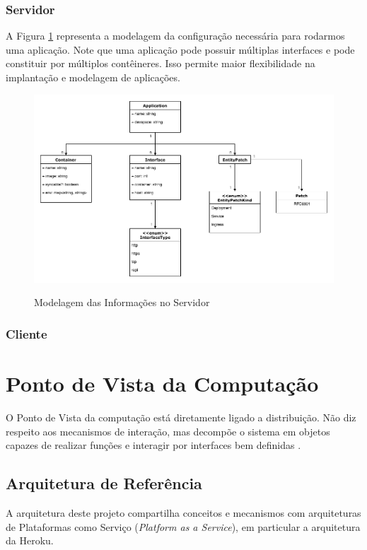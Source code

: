 	        \subsubsection{Servidor}
	        A Figura \ref{fig:info-server} representa a modelagem da configuração necessária para rodarmos uma aplicação. Note que uma aplicação pode possuir múltiplas interfaces e pode constituir por múltiplos contêineres. Isso permite maior flexibilidade na implantação e modelagem de aplicações.
	        \begin{figure}[htb]
        	    \centering
        	    \caption{Modelagem das Informações no Servidor}
        	    \includegraphics[scale=0.40]{pictures/especificacao-de-projeto/info-server.png}
        	    \label{fig:info-server}
	        \end{figure}
	        \subsubsection{Cliente}
	            
	\section{Ponto de Vista da Computação}
	    O Ponto de Vista da computação está diretamente ligado a distribuição. Não diz respeito aos mecanismos de interação, mas decompõe o sistema em objetos capazes de realizar funções e interagir por interfaces bem definidas \cite{odppart1}.
	    \subsection{Arquitetura de Referência} %
	        A arquitetura deste projeto compartilha conceitos e mecanismos com arquiteturas de Plataformas como Serviço (\textit{Platform as a Service}), em particular a arquitetura da Heroku.
	        
